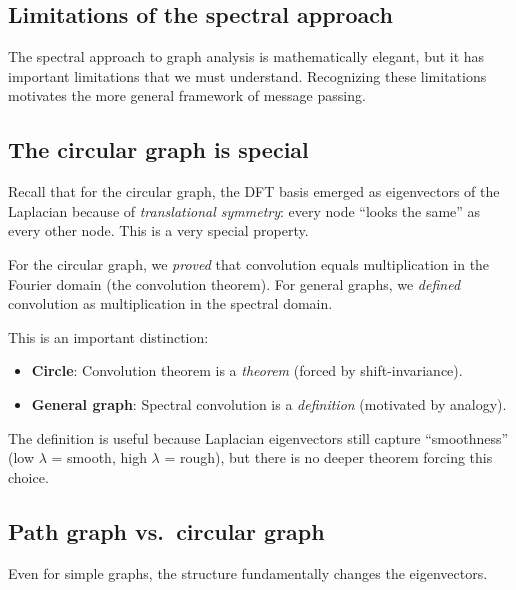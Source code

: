 \begin{notechapter}
\section{Limitations of the spectral approach}

The spectral approach to graph analysis is mathematically elegant, but
it has important limitations that we must understand. Recognizing these
limitations motivates the more general framework of message passing.

\subsection{The circular graph is special}

Recall that for the circular graph, the DFT basis emerged as
eigenvectors of the Laplacian because of \emph{translational
symmetry}: every node ``looks the same'' as every other node. This is
a very special property.

\begin{remark}
For the circular graph, we \emph{proved} that convolution equals
multiplication in the Fourier domain (the convolution theorem). For
general graphs, we \emph{defined} convolution as multiplication in
the spectral domain.

This is an important distinction:
\begin{itemize}
    \item \textbf{Circle}: Convolution theorem is a \emph{theorem}
          (forced by shift-invariance).
    \item \textbf{General graph}: Spectral convolution is a
          \emph{definition} (motivated by analogy).
\end{itemize}

The definition is useful because Laplacian eigenvectors still capture
``smoothness'' (low $\lambda$ = smooth, high $\lambda$ = rough), but
there is no deeper theorem forcing this choice.
\end{remark}

\subsection{Path graph vs.\ circular graph}

Even for simple graphs, the structure fundamentally changes the
eigenvectors.


\end{notechapter}
